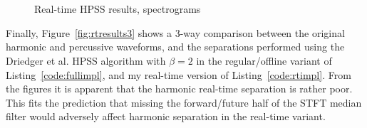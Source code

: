 \documentclass[letter,12pt]{article}
\begin{document}
\begin{figure}[ht]
	\centering
	\\
	\\
	\caption{Real-time HPSS results, spectrograms}
	\label{fig:rtresults2}
\end{figure}

\vfill
\clearpage %

Finally, Figure~\ref{fig:rtresults3} shows a 3-way comparison between the original harmonic and percussive waveforms, and the separations performed using the Driedger et al. HPSS algorithm with $\beta = 2$ in the regular/offline variant of Listing~\ref{code:fullimpl}, and my real-time version of Listing~\ref{code:rtimpl}. From the figures it is apparent that the harmonic real-time separation is rather poor. This fits the prediction that missing the forward/future half of the STFT median filter would adversely affect harmonic separation in the real-time variant.\\
\end{document}
